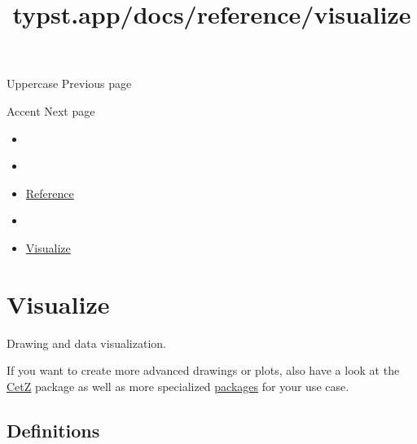 \href{/docs/reference/text/upper/}{\pandocbounded{}}

{ Uppercase } { Previous page }

\href{/docs/reference/math/accent/}{\pandocbounded{}}

{ Accent } { Next page }


\title{typst.app/docs/reference/visualize}

\begin{itemize}
\tightlist
\item
  \href{/docs}{}
\item
  
\item
  \href{/docs/reference/}{Reference}
\item
  
\item
  \href{/docs/reference/visualize/}{Visualize}
\end{itemize}

\section{Visualize}\label{summary}

Drawing and data visualization.

If you want to create more advanced drawings or plots, also have a look
at the \href{https://github.com/johannes-wolf/cetz}{CetZ} package as
well as more specialized \href{https://typst.app/universe/}{packages}
for your use case.

\subsection{Definitions}\label{definitions}

